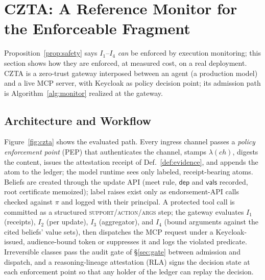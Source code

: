 \documentclass[conference,compsoc]{IEEEtran}
\theoremstyle{definition}
\theoremstyle{plain}
\newcommand{\Ione}{\ensuremath{I_1}}
\newcommand{\Itwo}{\ensuremath{I_2}}
\newcommand{\Ithree}{\ensuremath{I_3}}
\newcommand{\Ifour}{\ensuremath{I_4}}
\newcommand{\deps}{\ensuremath{\mathsf{dep}}}
\newcommand{\vals}{\ensuremath{\mathsf{vals}}}
\begin{document}
\section{CZTA: A Reference Monitor for the Enforceable Fragment}
\label{sec:czta}
Proposition~\ref{prop:safety} says \Ione--\Ifour{} \emph{can} be
enforced by execution monitoring; this section shows how they are
enforced, at measured cost, on a real deployment. CZTA is a zero-trust
gateway interposed between an agent (a production model) and a live
MCP server, with Keycloak as policy decision point; its admission path
is Algorithm~\ref{alg:monitor} realized at the gateway.

\subsection{Architecture and Workflow}
\label{sec:arch}
Figure~\ref{fig:czta} shows the evaluated path. Every ingress channel
passes a \emph{policy enforcement point} (PEP) that authenticates the
channel, stamps $\lambda(\mathit{ch})$, digests the content, issues the
attestation receipt of Def.~\ref{def:evidence}, and appends the atom to
the ledger; the model runtime sees only labeled, receipt-bearing atoms.
Beliefs are created through the update API (meet rule, $\deps$ and
$\vals$ recorded, root certificate memoized); label raises exist only
as endorsement-API calls checked against $\pi$ and logged with their
principal. A protected tool call is committed as a structured
\textsc{support}/\textsc{action}/\textsc{args} step; the gateway
evaluates \Ione{} (receipts), \Itwo{} (per update), \Ithree{}
(aggregator), and \Ifour{} (bound arguments against the cited beliefs'
value sets), then dispatches the MCP request under a Keycloak-issued,
audience-bound token or suppresses it and logs the violated predicate.
Irreversible classes pass the audit gate of \S\ref{sec:gate} between
admission and dispatch, and a reasoning-lineage attestation (RLA) signs
the decision state at each enforcement point so that any holder of the
ledger can replay the decision.
\end{document}
